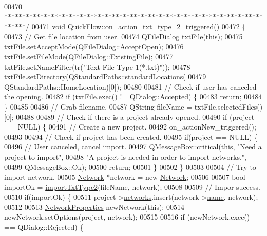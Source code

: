 \begin{DoxyCode}
00470 \textcolor{comment}{ ******************************************************************************/}
00471 \textcolor{keywordtype}{void} QuickFlow::on\_action\_txt\_type\_2\_triggered()
00472 \{
00473   \textcolor{comment}{// Get file location from user.}
00474   QFileDialog txtFile(\textcolor{keyword}{this});
00475   txtFile.setAcceptMode(QFileDialog::AcceptOpen);
00476   txtFile.setFileMode(QFileDialog::ExistingFile);
00477   txtFile.setNameFilter(tr(\textcolor{stringliteral}{"Text File Type 1(*.txt)"}));
00478   txtFile.setDirectory(QStandardPaths::standardLocations(
00479                          QStandardPaths::HomeLocation)[0]);
00480 
00481   \textcolor{comment}{// Check if user has canceled the opening.}
00482   \textcolor{keywordflow}{if} (txtFile.exec() != QDialog::Accepted) \{
00483     \textcolor{keywordflow}{return};
00484   \}
00485 
00486   \textcolor{comment}{// Grab filename.}
00487   QString fileName = txtFile.selectedFiles()[0];
00488 
00489   \textcolor{comment}{// Check if there is a project already opened.}
00490   \textcolor{keywordflow}{if} (project == NULL) \{
00491     \textcolor{comment}{// Create a new project.}
00492     on\_actionNew\_triggered();
00493 
00494     \textcolor{comment}{// Check if project has been created.}
00495     \textcolor{keywordflow}{if}(project == NULL) \{
00496       \textcolor{comment}{// User canceled, cancel import.}
00497       QMessageBox::critical(\textcolor{keyword}{this}, \textcolor{stringliteral}{"Need a project to import"},
00498                             \textcolor{stringliteral}{"A project is needed in order to import networks."},
00499                             QMessageBox::Ok);
00500       \textcolor{keywordflow}{return};
00501     \}
00502   \}
00503 
00504   \textcolor{comment}{// Try to import network.}
00505   \hyperlink{class_network}{Network} *network = \textcolor{keyword}{new} \hyperlink{class_network}{Network};
00506 
00507   \textcolor{keywordtype}{bool} importOk = \hyperlink{import_8cpp_aef466de21b145a0fdf215dd1a6409924}{importTxtType2}(fileName, network);
00508 
00509   \textcolor{comment}{// Impor success.}
00510   \textcolor{keywordflow}{if}(importOk) \{
00511     project->\hyperlink{class_project_aa98126154cab59769a431668e6f17daf}{networks}.insert(network->\hyperlink{class_network_ab6643733a517f930c60b06f5ffd78186}{name}, network);
00512 
00513     \hyperlink{class_network_properties}{NetworkProperties} newNetwork(\textcolor{keyword}{this});
00514     newNetwork.setOptions(project, network);
00515 
00516     \textcolor{keywordflow}{if} (newNetwork.exec() == QDialog::Rejected) \{

\end{DoxyCode}
